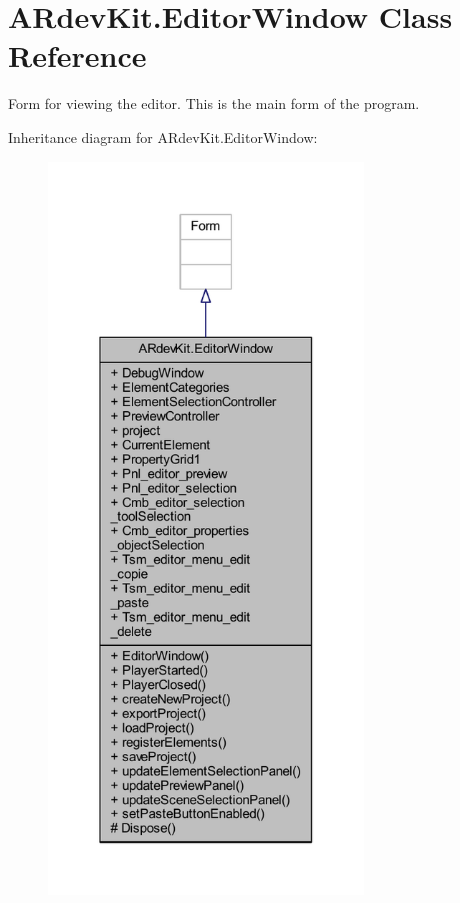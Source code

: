 \hypertarget{class_a_rdev_kit_1_1_editor_window}{\section{A\-Rdev\-Kit.\-Editor\-Window Class Reference}
\label{class_a_rdev_kit_1_1_editor_window}
}


Form for viewing the editor. This is the main form of the program.  




Inheritance diagram for A\-Rdev\-Kit.\-Editor\-Window\-:
\nopagebreak
\begin{figure}[H]
\begin{center}
\leavevmode
\includegraphics[height=550pt]{class_a_rdev_kit_1_1_editor_window__inherit__graph}
\end{center}
\end{figure}


